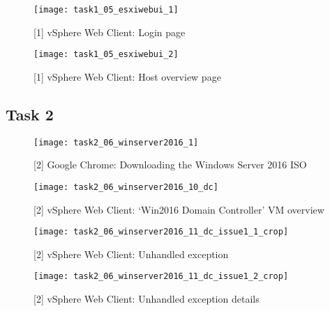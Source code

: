 \begin{figure}[H]
  \centering
  \captionsetup{skip=2pt}
  \texttt{[image: task1\_05\_esxiwebui\_1]}
  \caption{[1] vSphere Web Client: Login page}
  \label{fig:task1:esxiwebui_01}
\end{figure}

\begin{figure}[H]
  \centering
  \captionsetup{skip=2pt}
  \texttt{[image: task1\_05\_esxiwebui\_2]}
  \caption{[1] vSphere Web Client: Host overview page}
  \label{fig:task1:esxiwebui_02}
\end{figure}

\subsection{Task 2}
\begin{figure}[H]
  \centering
  \captionsetup{skip=2pt}
  \texttt{[image: task2\_06\_winserver2016\_1]}
  \caption{[2] Google Chrome: Downloading the Windows Server 2016 ISO}
  \label{fig:task2:winserver2016_download}
\end{figure}

\begin{figure}[H]
  \centering
  \captionsetup{skip=2pt}
  \texttt{[image: task2\_06\_winserver2016\_10\_dc]}
  \caption{[2] vSphere Web Client: `Win2016 Domain Controller' VM overview}
  \label{fig:task2:vspherewc_newvm4}
\end{figure}

\begin{figure}[H]
  \centering
  \captionsetup{skip=2pt}
  \texttt{[image: task2\_06\_winserver2016\_11\_dc\_issue1\_1\_crop]}
  \caption{[2] vSphere Web Client: Unhandled exception}
  \label{fig:task2:vspherewc_bug1}
\end{figure}

\begin{figure}[H]
  \centering
  \captionsetup{skip=2pt}
  \texttt{[image: task2\_06\_winserver2016\_11\_dc\_issue1\_2\_crop]}
  \caption{[2] vSphere Web Client: Unhandled exception details}
  \label{fig:task2:vspherewc_bug2}
\end{figure}

%
